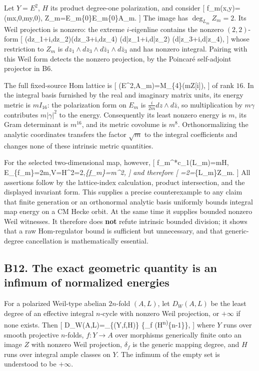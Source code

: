 \documentclass[11pt,a4paper]{article}
\theoremstyle{definition}
\begin{document}
Let \(Y=E^2\), \(H\) its product degree-one polarization, and consider
{[} f\_m(x,y)=(mx,0,my,0),\qquad
Z\_m=E\_m\times\{0\}\times E\_m\times\{0\}\subset A\_m. {]} The image
has \(\deg_{L_m}Z_m=2\). Its Weil projection is nonzero: the extreme
\(i\)-eigenline contains the nonzero \((2,2)\)-form {[}
(dz\_1+i,dz\_2)\wedge(dz\_3+i,dz\_4) \wedge(d\bar z\_1+i,d\bar z\_2)
\wedge(d\bar z\_3+i,d\bar z\_4), {]} whose restriction to \(Z_m\) is
\(dz_1\wedge dz_3\wedge d\bar z_1\wedge d\bar z_3\) and has nonzero
integral. Pairing with this Weil form detects the nonzero projection, by
the Poincaré self-adjoint projector in B6.

The full fixed-source Hom lattice is {[}
(E\^{}2,A\_m)=M\_\{4\}(m\mathbb Z{[}i{]}), {]}
of rank \(16\). In the integral basis furnished by the real and
imaginary matrix units, its energy metric is \(m I_{16}\): the
polarization form on \(E_m\) is \(\frac{i}{2m}dz\wedge d\bar z\), so
multiplication by \(m\gamma\) contributes \(m|\gamma|^2\) to the energy.
Consequently its least nonzero energy is \(m\), its Gram determinant is
\(m^{16}\), and its metric covolume is \(m^8\). Orthonormalizing the
analytic coordinates transfers the factor \(\sqrt m\) to the integral
coefficients and changes none of these intrinsic metric quantities.

For the selected two-dimensional map, however, {[}
f\_m\^{}*c\_1(L\_m)=mH,\quad
E\_\{f\_m\}=2m,\quad V=H\^{}2=2,\quad \delta\emph{\{f\_m\}=m\^{}2, {]}
and therefore {[} =2=\deg}\{L\_m\}Z\_m.
{]} All assertions follow by the lattice-index calculation, product
intersection, and the displayed invariant form. This supplies a precise
counterexample to any claim that finite generation or an orthonormal
analytic basis uniformly bounds integral map energy on a CM Hecke orbit.
At the same time it supplies bounded nonzero Weil witnesses. It
therefore does \textbf{not} refute intrinsic bounded division; it shows
that a raw Hom-regulator bound is sufficient but unnecessary, and that
generic-degree cancellation is mathematically essential.

\subsection{B12. The exact geometric quantity is an infimum of
normalized
energies}\label{b12.-the-exact-geometric-quantity-is-an-infimum-of-normalized-energies}

For a polarized Weil-type abelian \(2n\)-fold \((A,L)\), let
\(D_W(A,L)\) be the least degree of an effective integral \(n\)-cycle
with nonzero Weil projection, or \(+\infty\) if none exists. Then {[}
D\_W(A,L)=\inf\_\{(Y,f,H)\} 
\{\delta\_f (H\textsuperscript{n)}\{n-1\}\},  {]} where \(Y\)
runs over smooth projective \(n\)-folds, \(f:Y\to A\) over morphisms
generically finite onto an image \(Z\) with nonzero Weil projection,
\(\delta_f\) is the generic mapping degree, and \(H\) runs over integral
ample classes on \(Y\). The infimum of the empty set is understood to be
\(+\infty\).
\end{document}
